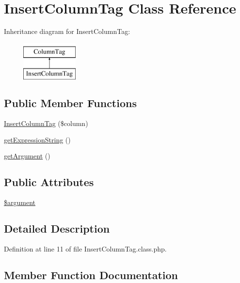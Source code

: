 \hypertarget{classInsertColumnTag}{}\section{Insert\+Column\+Tag Class Reference}
\label{classInsertColumnTag}
Inheritance diagram for Insert\+Column\+Tag\+:\begin{figure}[H]
\begin{center}
\leavevmode
\includegraphics[height=2.000000cm]{classInsertColumnTag}
\end{center}
\end{figure}
\subsection*{Public Member Functions}
\begin{DoxyCompactItemize}
\item 
\hyperlink{classInsertColumnTag_a7ca1654435b7a6e73d269f9e4f50e119}{Insert\+Column\+Tag} (\$column)
\item 
\hyperlink{classInsertColumnTag_a77e3aba891447e4d9fddc8a91c6ca9da}{get\+Expression\+String} ()
\item 
\hyperlink{classInsertColumnTag_a951d60b78c53d03e3921c1082502ccc4}{get\+Argument} ()
\end{DoxyCompactItemize}
\subsection*{Public Attributes}
\begin{DoxyCompactItemize}
\item 
\hyperlink{classInsertColumnTag_a1aa52b3296f70706efacf27d1a1abc6c}{\$argument}
\end{DoxyCompactItemize}


\subsection{Detailed Description}


Definition at line 11 of file Insert\+Column\+Tag.\+class.\+php.



\subsection{Member Function Documentation}
\mbox{\label{classInsertColumnTag_a951d60b78c53d03e3921c1082502ccc4}} 
